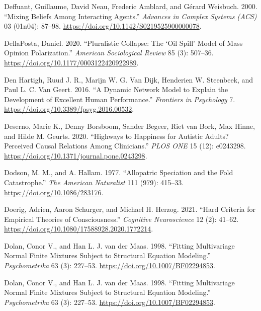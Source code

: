 \documentclass[
  a4paper,
  DIV=11,
  numbers=noendperiod]{scrreprt}
\newlength{\cslhangindent}
\newlength{\cslentryspacingunit} %
\newenvironment{CSLReferences}[2] %
 {%
  \setlength{\parindent}{0pt}
  \ifodd #1
  \let\oldpar\par
  \def\par{\hangindent=\cslhangindent\oldpar}
  \fi
  \setlength{\parskip}{#2\cslentryspacingunit}
 }%
 {}
\begin{document}
\begin{CSLReferences}{1}{0}
\leavevmode{}%
Deffuant, Guillaume, David Neau, Frederic Amblard, and Gérard Weisbuch.
2000. {``Mixing Beliefs Among Interacting Agents.''} \emph{Advances in
Complex Systems (ACS)} 03 (01n04): 87--98.
\url{https://doi.org/10.1142/S0219525900000078}.

\leavevmode{}%
DellaPosta, Daniel. 2020. {``Pluralistic {Collapse}: {The} {`{Oil
Spill}'} {Model} of {Mass Opinion Polarization}.''} \emph{American
Sociological Review} 85 (3): 507--36.
\url{https://doi.org/10.1177/0003122420922989}.

\leavevmode{}%
Den Hartigh, Ruud J. R., Marijn W. G. Van Dijk, Henderien W. Steenbeek,
and Paul L. C. Van Geert. 2016. {``A {Dynamic Network Model} to
{Explain} the {Development} of {Excellent Human Performance}.''}
\emph{Frontiers in Psychology} 7.
\url{https://doi.org/10.3389/fpsyg.2016.00532}.

\leavevmode{}%
Deserno, Marie K., Denny Borsboom, Sander Begeer, Riet van Bork, Max
Hinne, and Hilde M. Geurts. 2020. {``Highways to Happiness for Autistic
Adults? {Perceived} Causal Relations Among Clinicians.''} \emph{PLOS
ONE} 15 (12): e0243298.
\url{https://doi.org/10.1371/journal.pone.0243298}.

\leavevmode{}%
Dodson, M. M., and A. Hallam. 1977. {``Allopatric {Speciation} and the
{Fold Catastrophe}.''} \emph{The American Naturalist} 111 (979):
415--33. \url{https://doi.org/10.1086/283176}.

\leavevmode{}%
Doerig, Adrien, Aaron Schurger, and Michael H. Herzog. 2021. {``Hard
Criteria for Empirical Theories of Consciousness.''} \emph{Cognitive
Neuroscience} 12 (2): 41--62.
\url{https://doi.org/10.1080/17588928.2020.1772214}.

\leavevmode{}%
Dolan, Conor V., and Han L. J. van der Maas. 1998. {``Fitting
Multivariage Normal Finite Mixtures Subject to Structural Equation
Modeling.''} \emph{Psychometrika} 63 (3): 227--53.
\url{https://doi.org/10.1007/BF02294853}.

\leavevmode{}%
Dolan, Conor V., and Han L. J. van der Maas. 1998. {``Fitting
Multivariage Normal Finite Mixtures Subject to Structural Equation
Modeling.''} \emph{Psychometrika} 63 (3): 227--53.
\url{https://doi.org/10.1007/BF02294853}.


\end{CSLReferences}
\end{document}
